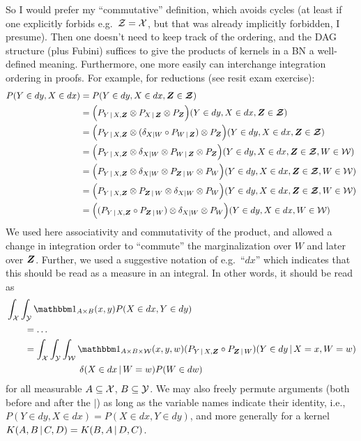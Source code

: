 So I would prefer my ``commutative'' definition, which avoids cycles (at least if one explicitly forbids e.g.\ $\mathcal{Z} = \mathcal{X}$, but that was already implicitly forbidden, I presume).
Then one doesn't need to keep track of the ordering, and the DAG structure (plus Fubini) suffices to give the products of kernels in a BN a well-defined meaning.
Furthermore, one more easily can interchange integration ordering in proofs. For example, for reductions (see resit exam exercise):
\begin{align*}
  P(Y \in dy, X \in dx) 
  &= P(Y \in dy, X \in dx, \bm{Z} \in \bm{\mathcal{Z}}) \\
  &= \Big(P_{Y\operatorname*{|} X,\bm{Z}} \otimes P_{X\operatorname*{|} \bm{Z}} \otimes P_{\bm{Z}}\Big)(Y \in dy, X \in dx, \bm{Z} \in \bm{\mathcal{Z}}) \\
  &= \Big(P_{Y\operatorname*{|} X,\bm{Z}} \otimes (\delta_{X|W} \circ P_{W\operatorname*{|}\bm{Z}}) \otimes P_{\bm{Z}}\Big)(Y \in dy, X \in dx, \bm{Z} \in \bm{\mathcal{Z}}) \\
  &= \Big(P_{Y\operatorname*{|} X,\bm{Z}} \otimes \delta_{X|W} \otimes P_{W\operatorname*{|}\bm{Z}} \otimes P_{\bm{Z}}\Big)(Y \in dy, X \in dx, \bm{Z} \in \bm{\mathcal{Z}}, W \in \mathcal{W}) \\
  &= \Big(P_{Y\operatorname*{|} X,\bm{Z}} \otimes \delta_{X|W} \otimes P_{\bm{Z}\operatorname*{|} W} \otimes P_{W}\Big)(Y \in dy, X \in dx, \bm{Z} \in \bm{\mathcal{Z}}, W \in \mathcal{W}) \\
  &= \Big(P_{Y\operatorname*{|} X,\bm{Z}} \otimes P_{\bm{Z}\operatorname*{|} W} \otimes \delta_{X|W} \otimes P_{W}\Big)(Y \in dy, X \in dx, \bm{Z} \in \bm{\mathcal{Z}}, W \in \mathcal{W}) \\
  &= \Big((P_{Y\operatorname*{|} X,\bm{Z}} \circ P_{\bm{Z}\operatorname*{|} W}) \otimes \delta_{X|W} \otimes P_{W}\Big)(Y \in dy, X \in dx, W \in \mathcal{W})
\end{align*}
We used here associativity and commutativity of the product, and allowed a change in integration order to ``commute'' the marginalization over $W$ and later over $\bm{Z}$. Further, we used a suggestive notation of e.g.\ ``$dx$'' which indicates that this should be read as a measure in an integral. In other words, it should be read as
\begin{equation*}\begin{split}
  & \int_{\C{X}}\int_{\C{Y}} \I_{A \times B}(x,y) P(X \in dx, Y \in dy) \\ 
  &\qquad = \dots \\
  &\qquad = \int_{\C{X}}\int_{\C{Y}}\int_{\C{W}} \I_{A \times B \times \C{W}}(x,y,w) (P_{Y\given X,\B{Z}} \circ P_{\B{Z}\given W})(Y \in dy \given X=x, W=w) \\
  &\qquad\qquad\qquad\qquad \delta(X \in dx\given W=w) P(W \in dw)
\end{split}\end{equation*}
for all measurable $A \subseteq \mathcal{X}$, $B \subseteq \mathcal{Y}$.
We may also freely permute arguments (both before and after the $|$) as long as the variable names indicate their identity, i.e.,
$P(Y \in dy, X \in dx) = P(X \in dx, Y \in dy)$, and more generally for a kernel $K(A,B \operatorname*{|} C,D) = K(B,A \operatorname*{|} D,C)$.

